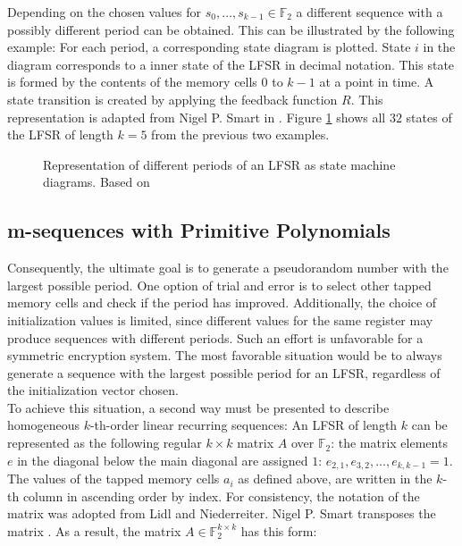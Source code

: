 Depending on the chosen values for $s_0,\ldots,s_{k-1}\in \mathbb{F}_2$ a different sequence with a possibly different period can be obtained. This can be illustrated by the following example: For each period, a corresponding state diagram is plotted. State $i$ in the diagram corresponds to a inner state of the LFSR in decimal notation. This state is formed by the contents of the memory cells $0$ to $k-1$ at a point in time. A state transition is created by applying the feedback function $R$. This representation is adapted from Nigel P. Smart in \cite[pp. 230]{Smart.2016}. Figure \ref{fig:Figure_6} shows all $32$ states of the LFSR of length $k=5$ from the previous two examples. 

\begin{figure}[h]
	\centering
	
	\caption{Representation of different periods of an LFSR as state machine diagrams. Based on \cite[pp. 230-232]{Smart.2016}}
	\label{fig:Figure_6}
\end{figure} 

\pagebreak

\subsection{m-sequences with Primitive Polynomials}
Consequently, the ultimate goal is to generate a pseudorandom number with the largest possible period. One option of trial and error is to select other tapped memory cells and check if the period has improved. Additionally, the choice of initialization values is limited, since different values for the same register may produce sequences with different periods. Such an effort is unfavorable for a symmetric encryption system. The most favorable situation would be to always generate a sequence with the largest possible period for an LFSR, regardless of the initialization vector chosen.\\

To achieve this situation, a second way must be presented to describe homogeneous $k$-th-order linear recurring sequences: An LFSR of length $k$ can be represented as the following regular $k\times{k}$ matrix $A$ over $\mathbb{F}_2$: the matrix elements $e$ in the diagonal below the main diagonal are assigned $1$: $e_{2,1},e_{3,2},\ldots,e_{k,k-1}=1$. The values of the tapped memory cells $a_i$ as defined above, are written in the $k$-th column in ascending order by index. \cite[p. 191]{Lidl.1986} For consistency, the notation of the matrix was adopted from Lidl and Niederreiter. Nigel P. Smart transposes the matrix \cite[p. 218]{Smart.2016}. As a result, the matrix $A\in \mathbb{F}_2^{k\times{k}}$ has this form:

